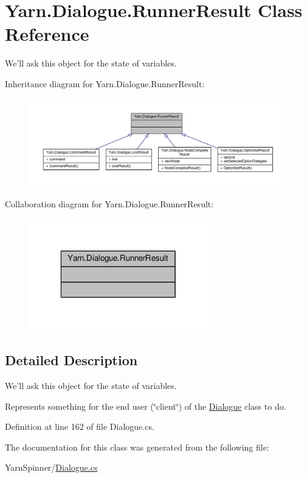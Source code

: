 \hypertarget{a00143}{\section{Yarn.\-Dialogue.\-Runner\-Result Class Reference}
\label{a00143}
}


We'll ask this object for the state of variables.  




Inheritance diagram for Yarn.\-Dialogue.\-Runner\-Result\-:
\nopagebreak
\begin{figure}[H]
\begin{center}
\leavevmode
\includegraphics[width=350pt]{a00603}
\end{center}
\end{figure}


Collaboration diagram for Yarn.\-Dialogue.\-Runner\-Result\-:
\nopagebreak
\begin{figure}[H]
\begin{center}
\leavevmode
\includegraphics[width=220pt]{a00604}
\end{center}
\end{figure}


\subsection{Detailed Description}
We'll ask this object for the state of variables. 

Represents something for the end user (\char`\"{}client\char`\"{}) of the \hyperlink{a00090}{Dialogue} class to do. 

Definition at line 162 of file Dialogue.\-cs.



The documentation for this class was generated from the following file\-:\begin{DoxyCompactItemize}
\item 
Yarn\-Spinner/\hyperlink{a00285}{Dialogue.\-cs}\end{DoxyCompactItemize}
